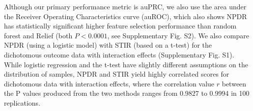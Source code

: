 \documentclass[10pt]{article}
\begin{document}

Although our primary performance metric is auPRC, we also use the area under the Receiver Operating Characteristics curve (auROC), which also shows NPDR has statistically significant higher feature selection performance than random forest and Relief (both $P < 0.0001$, see Supplementary Fig. S2).
We also compare NPDR (using a logistic model) with STIR (based on a t-test) for the dichotomous outcome data with interaction effects (Supplementary Fig. S1).
While logistic regression and the t-test have slightly different assumptions on the distribution of samples, NPDR and STIR yield highly correlated scores for dichotomous data with interaction effects, where the correlation value $r$ between the P values produced from the two methods ranges from 0.9827 to 0.9994 in 100 replications.
\end{document}
